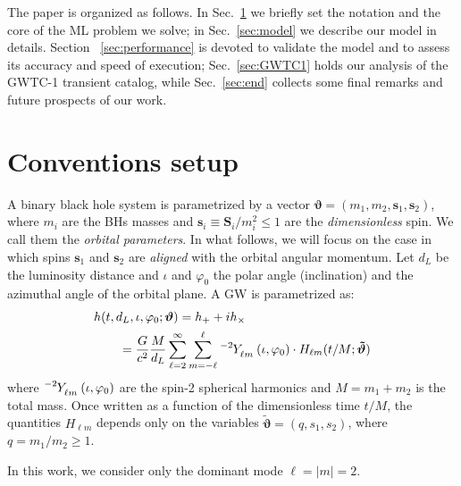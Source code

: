 The paper is organized as follows. In Sec.~\ref{sec:setup} we briefly set the 
notation and the core of the ML problem we solve; in Sec.~\ref{sec:model} we describe 
our model in details. Section ~\ref{sec:performance} is devoted to validate the model 
and to assess its accuracy and speed of execution; Sec.~\ref{sec:GWTC1} holds 
our analysis of the GWTC-1 transient catalog, while  Sec.~\ref{sec:end} collects 
some final remarks and future prospects of our work.

\section{Conventions setup}
\label{sec:setup}
A binary black hole system is parametrized by a vector $ \boldsymbol{\vartheta} = (m_1,m_2, \mathbf{s}_1,\mathbf{s}_2) $, where $m_i$ are the 
BHs masses and $\mathbf{s}_i \equiv \mathbf{S}_i/m_i^2 \leq 1$ are the 
\textit{dimensionless} spin. We call them the \textit{orbital parameters}.
In what follows, we will focus on the case in which spins $\mathbf{s}_1$ and $\mathbf{s}_2$ are \textit{aligned} with the orbital angular momentum. 
Let $d_L$ be the luminosity distance and $\iota$ and $\varphi_0$ the polar angle (inclination) and the azimuthal angle of the orbital plane.
A GW is parametrized as:
\begin{align} \label{eq:h_parametrization}
	&h(t, d_L,\iota,\varphi_0; \boldsymbol{\vartheta}) = h_+ + i h_\times \nonumber \\
		&\qquad= \frac{G}{c^2} \frac{M}{d_L}\sum_{\ell = 2}^{\infty} \sum_{m = -\ell}^{\ell} \tensor[^{-2}]{Y}{_{\ell m}}(\iota, \varphi_0) \cdot H_{\ell m}(t/M; \boldsymbol{\tilde{\vartheta}})
\end{align}
where $\tensor[^{-2}]{Y}{_{\ell m}}(\iota, \varphi_0)$ are the spin-2 spherical harmonics and $M = m_1+m_2$ is the total mass.
Once written as a function of the dimensionless time $t/M$, the quantities $H_{\ell m}$ depends only on the variables $\tilde{\boldsymbol{\vartheta}} = (q, s_1, s_2)$, where $q= m_1/m_2 \geq 1$.
\par
In this work, we consider only the dominant mode $\ell=|m|=2$.
